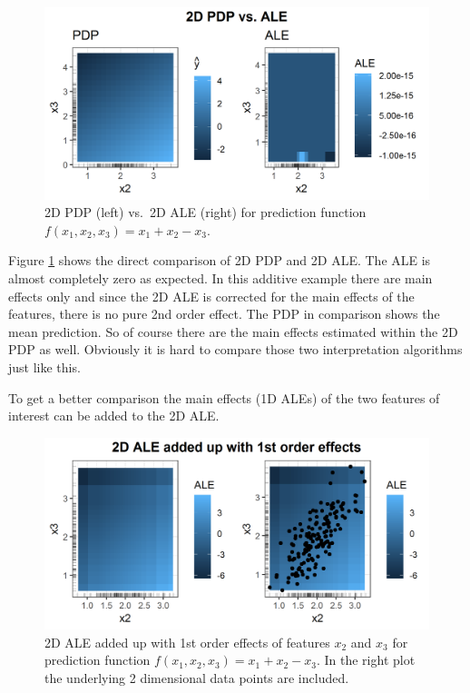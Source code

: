 \documentclass[
]{krantz}
\begin{document}
\begin{figure}
\includegraphics[width=1\linewidth]{images/ale_1_2d_comp_x1_plus_x2_minus_x3_150_0_2_0p5} \caption{2D PDP (left) vs.~2D ALE (right) for prediction function \(f(x_1, x_2, x_3) = x_1 + x_2 - x_3\).}\label{fig:x1px2mx3ale2D}
\end{figure}



Figure \ref{fig:x1px2mx3ale2D} shows the direct comparison of 2D PDP and 2D ALE. The ALE is almost completely zero as expected. In this additive example there are main effects only and since the 2D ALE is corrected for the main effects of the features, there is no pure 2nd order effect. The PDP in comparison shows the mean prediction. So of course there are the main effects estimated within the 2D PDP as well. Obviously it is hard to compare those two interpretation algorithms just like this.

To get a better comparison the main effects (1D ALEs) of the two features of interest can be added to the 2D ALE.

\begin{figure}
\includegraphics[width=1\linewidth]{images/ale_1_2d_ale_plus_x1_plus_x2_minus_x3_150_0_2_0p5} \caption{2D ALE added up with 1st order effects of features \(x_2\) and \(x_3\) for prediction function \(f(x_1, x_2, x_3) = x_1 + x_2 - x_3\). In the right plot the underlying 2 dimensional data points are included.}\label{fig:ale2DaddedUp}
\end{figure}
\end{document}
